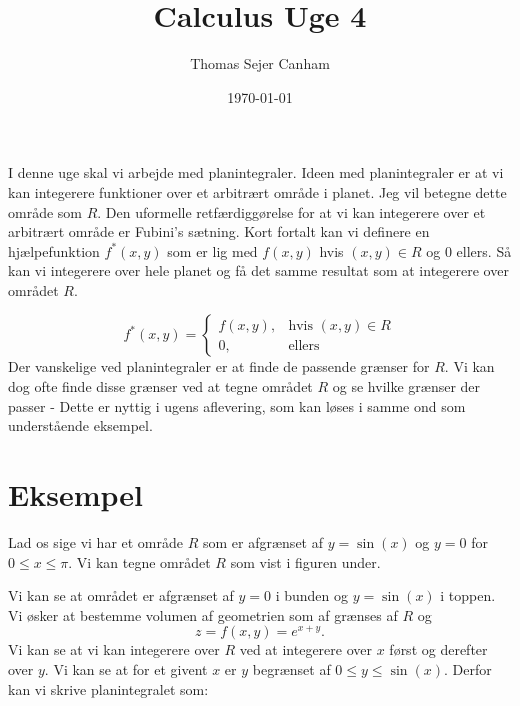 \documentclass{article}
\title{Calculus Uge 4}
\author{Thomas Sejer Canham}
\date{\today}
\begin{document}
\begin{titlepage}
 \maketitle
 \thispagestyle{empty}
\end{titlepage}
I denne uge skal vi arbejde med planintegraler. Ideen med planintegraler er at vi kan integerere funktioner over et arbitrært område i planet. Jeg vil betegne dette område som $R$. Den uformelle retfærdiggørelse for at vi kan integerere over et arbitrært område er Fubini's sætning. Kort fortalt kan vi definere en hjælpefunktion $f^*(x,y)$ som er lig med $f(x,y)$ hvis $(x,y) \in R$ og 0 ellers. Så kan vi integerere over hele planet og få det samme resultat som at integerere over området $R$.

\begin{equation}
    f^*(x,y) = \begin{cases}
        f(x,y), & \text{hvis } (x,y) \in R \\
        0, & \text{ellers}
    \end{cases}
\end{equation}
Der vanskelige ved planintegraler er at finde de passende grænser for $R$. Vi kan dog ofte finde disse grænser ved at tegne området $R$ og se hvilke grænser der passer - Dette er nyttig i ugens aflevering, som kan løses i samme ond som understående eksempel.

\section{Eksempel}
    Lad os sige vi har et område $R$ som er afgrænset af $y = \sin(x)$ og $y = 0$ for $0 \leq x \leq \pi$. Vi kan tegne området $R$ som vist i figuren under.


    Vi kan se at området er afgrænset af $y = 0$ i bunden og $y = \sin(x)$ i toppen. Vi øsker at bestemme volumen af geometrien som af grænses af $R$ og
     $$z = f(x,y) = e^{x+y}.$$
    Vi kan se at vi kan integerere over $R$ ved at integerere over $x$ først og derefter over $y$. Vi kan se at for et givent $x$ er $y$ begrænset af $0 \leq y \leq \sin(x)$. Derfor kan vi skrive planintegralet som:
\end{document}
